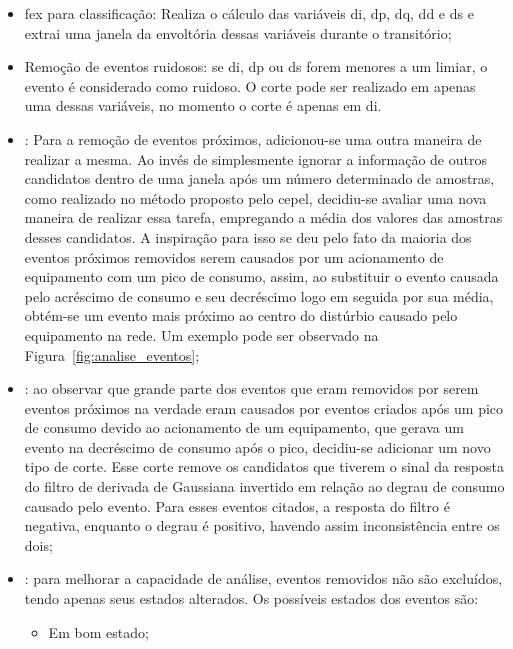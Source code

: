 \begin{itemize}
\item \acs{fex} para classificação: Realiza o cálculo das variáveis
\acs{di}, \acs{dp}, \acs{dq}, \acs{dd} e \acs{ds} e extrai uma janela
da envoltória dessas variáveis durante o transitório;
\item Remoção de eventos ruidosos: se \acs{di}, \acs{dp} ou \acs{ds}
forem menores a um limiar, o evento é considerado como ruidoso. O
corte pode ser realizado em apenas uma dessas variáveis, no momento o
corte é apenas em \acs{di}.
\item {}: Para a
remoção de eventos próximos, adicionou-se uma outra maneira de realizar
a mesma. Ao invés de simplesmente ignorar a informação de outros
candidatos dentro de uma janela após um número determinado de
amostras, como realizado no método proposto pelo \acs{cepel},
decidiu-se avaliar uma nova maneira de realizar essa tarefa,
empregando a média dos valores das amostras desses
candidatos. A inspiração para isso se deu pelo fato da maioria dos
eventos próximos removidos serem causados por um acionamento de
equipamento com um pico de consumo, assim, ao substituir o evento
causada pelo acréscimo de consumo e seu decréscimo logo em seguida por
sua média, obtém-se um evento mais próximo ao centro do distúrbio
causado pelo equipamento na rede. Um exemplo pode ser observado na
Figura~\ref{fig:analise_eventos};
\item {}: ao observar que grande parte dos
eventos que eram removidos por serem eventos próximos na verdade eram
causados por eventos criados após um pico de consumo devido ao
acionamento de um equipamento, que gerava um evento na decréscimo de
consumo após o pico, decidiu-se adicionar um novo tipo de corte. Esse
corte remove os candidatos que tiverem o sinal da resposta do filtro
de derivada de Gaussiana invertido em relação ao degrau de consumo
causado pelo evento. Para esses eventos citados, a resposta do filtro
é negativa, enquanto o degrau é positivo, havendo assim inconsistência
entre os dois;
\item {}: para
melhorar a capacidade de análise, eventos removidos não são excluídos,
tendo apenas seus estados alterados. Os possíveis estados dos eventos
são:
\begin{itemize}
\item Em bom estado;

\end{itemize}
\end{itemize}
